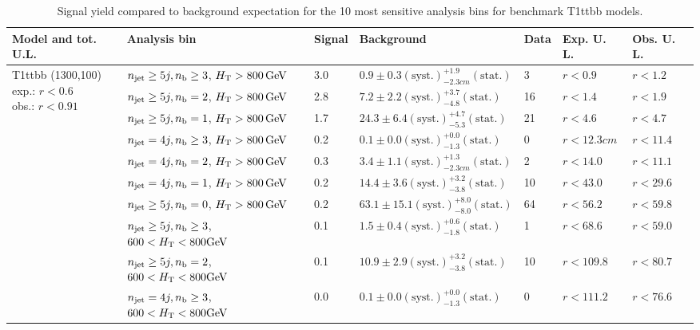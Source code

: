 \begin{table}[h!] 
  \scriptsize
  \caption{ 
Signal yield compared to background expectation for the 10 most sensitive analysis bins 
for benchmark T1ttbb models.
  \label{tab:sigBenchmarksYields_T1ttbb}}
  \centering 
  \begin{tabular}{ lllllll } 
    \hline 
    \hline 
    Model and tot. U.L. & Analysis bin & Signal & Background & Data & Exp. U. L. & Obs. U. L. \\ \hline
\multirow{10}{*}{\parbox[t]{2.3cm}{T1ttbb (1300,100)\\exp.: $r<0.6$\\obs.: $r<0.91$}}
 & $n_{\mathrm{jet}} \geq5j,n_{\text{b}} \geq3$, $\mbox{$H_\text{T}$} > 800 \, \mathrm{GeV}$ & 3.0 & $0.9 \pm 0.3 \mathrm{(syst.)} ^{+1.9}_{-2.3cm} \mathrm{(stat.)}$ & 3 & $r < 0.9$ & $r < 1.2$\\ 
 & $n_{\mathrm{jet}} \geq5j,n_{\text{b}} =2$, $\mbox{$H_\text{T}$} > 800 \, \mathrm{GeV}$ & 2.8 & $7.2 \pm 2.2 \mathrm{(syst.)} ^{+3.7}_{-4.8} \mathrm{(stat.)}$ & 16 & $r < 1.4$ & $r < 1.9$\\ 
 & $n_{\mathrm{jet}} \geq5j,n_{\text{b}} =1$, $\mbox{$H_\text{T}$} > 800 \, \mathrm{GeV}$ & 1.7 & $24.3 \pm 6.4 \mathrm{(syst.)} ^{+4.7}_{-5.3} \mathrm{(stat.)}$ & 21 & $r < 4.6$ & $r < 4.7$\\ 
 & $n_{\mathrm{jet}} =4j,n_{\text{b}} \geq3$, $\mbox{$H_\text{T}$} > 800 \, \mathrm{GeV}$ & 0.2 & $0.1 \pm 0.0 \mathrm{(syst.)} ^{+0.0}_{-1.3} \mathrm{(stat.)}$ & 0 & $r < 12.3cm$ & $r < 11.4$\\ 
 & $n_{\mathrm{jet}} =4j,n_{\text{b}} =2$, $\mbox{$H_\text{T}$} > 800 \, \mathrm{GeV}$ & 0.3 & $3.4 \pm 1.1 \mathrm{(syst.)} ^{+1.3}_{-2.3cm} \mathrm{(stat.)}$ & 2 & $r < 14.0$ & $r < 11.1$\\ 
 & $n_{\mathrm{jet}} =4j,n_{\text{b}} =1$, $\mbox{$H_\text{T}$} > 800 \, \mathrm{GeV}$ & 0.2 & $14.4 \pm 3.6 \mathrm{(syst.)} ^{+3.2}_{-3.8} \mathrm{(stat.)}$ & 10 & $r < 43.0$ & $r < 29.6$\\ 
 & $n_{\mathrm{jet}} \geq5j,n_{\text{b}} =0$, $\mbox{$H_\text{T}$} > 800 \, \mathrm{GeV}$ & 0.2 & $63.1 \pm 15.1 \mathrm{(syst.)} ^{+8.0}_{-8.0} \mathrm{(stat.)}$ & 64 & $r < 56.2$ & $r < 59.8$\\ 
 & $n_{\mathrm{jet}} \geq5j,n_{\text{b}} \geq3$, $600 < \mbox{$H_\text{T}$} < 800 \mathrm{GeV}$ & 0.1 & $1.5 \pm 0.4 \mathrm{(syst.)} ^{+0.6}_{-1.8} \mathrm{(stat.)}$ & 1 & $r < 68.6$ & $r < 59.0$\\ 
 & $n_{\mathrm{jet}} \geq5j,n_{\text{b}} =2$, $600 < \mbox{$H_\text{T}$} < 800 \mathrm{GeV}$ & 0.1 & $10.9 \pm 2.9 \mathrm{(syst.)} ^{+3.2}_{-3.8} \mathrm{(stat.)}$ & 10 & $r < 109.8$ & $r < 80.7$\\ 
 & $n_{\mathrm{jet}} =4j,n_{\text{b}} \geq3$, $600 < \mbox{$H_\text{T}$} < 800 \mathrm{GeV}$ & 0.0 & $0.1 \pm 0.0 \mathrm{(syst.)} ^{+0.0}_{-1.3} \mathrm{(stat.)}$ & 0 & $r < 111.2$ & $r < 76.6$\\ \hline

\end{tabular}
\end{table}

